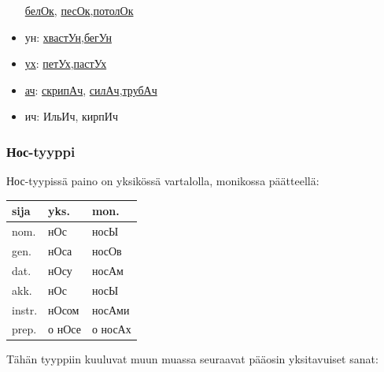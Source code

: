 \documentclass[]{scrreprt}
\begin{document}
\begin{itemize}
  \href{http://ru.wiktionary.org/wiki/\%D0\%B1\%D0\%B5\%D0\%BB\%D0\%BE\%D0\%BA}{белОк},
  \href{http://ru.wiktionary.org/wiki/\%D0\%BF\%D0\%B5\%D1\%81\%D0\%BE\%D0\%BA}{песОк},\href{http://ru.wiktionary.org/wiki/\%D0\%BF\%D0\%BE\%D1\%82\%D0\%BE\%D0\%BB\%D0\%BE\%D0\%BA}{потолОк}
\item
  ун:
  \href{http://ru.wiktionary.org/wiki/\%D1\%85\%D0\%B2\%D0\%B0\%D1\%81\%D1\%82\%D1\%83\%D0\%BD}{хвастУн},\href{http://ru.wiktionary.org/wiki/\%D0\%B1\%D0\%B5\%D0\%B3\%D1\%83\%D0\%BD}{бегУн}
\item
  \href{http://ru.wiktionary.org/wiki/\%D1\%83\%D1\%85}{ух}:
  \href{http://ru.wiktionary.org/wiki/\%D0\%BF\%D0\%B5\%D1\%82\%D1\%83\%D1\%85}{петУх},\href{http://ru.wiktionary.org/wiki/\%D0\%BF\%D0\%B0\%D1\%81\%D1\%82\%D1\%83\%D1\%85}{пастУх}
\item
  \href{http://ru.wiktionary.org/wiki/\%D0\%B0\%D1\%87}{ач}:
  \href{http://ru.wiktionary.org/wiki/\%D1\%81\%D0\%BA\%D1\%80\%D0\%B8\%D0\%BF\%D0\%B0\%D1\%87}{скрипАч},
  \href{http://ru.wiktionary.org/wiki/\%D1\%81\%D0\%B8\%D0\%BB\%D0\%B0\%D1\%87}{силАч},\href{http://ru.wiktionary.org/wiki/\%D1\%82\%D1\%80\%D1\%83\%D0\%B1\%D0\%B0\%D1\%87}{трубАч}
\item
  ич: ИльИч, кирпИч
\end{itemize}

\subsubsection{Нос-tyyppi}\label{ux43dux43eux441-tyyppi}

Нос-tyypissä paino on yksikössä vartalolla, monikossa päätteellä:

\begin{longtable}[c]{@{}lll@{}}
\toprule
sija & yks. & mon.\tabularnewline
\midrule
\endhead
nom. & нОс & носЫ\tabularnewline
gen. & нОса & носОв\tabularnewline
dat. & нОсу & носАм\tabularnewline
akk. & нОс & носЫ\tabularnewline
instr. & нОсом & носАми\tabularnewline
prep. & о нОсе & о носАх\tabularnewline
\bottomrule
\end{longtable}

Tähän tyyppiin kuuluvat muun muassa seuraavat pääosin yksitavuiset
sanat:
\end{document}
